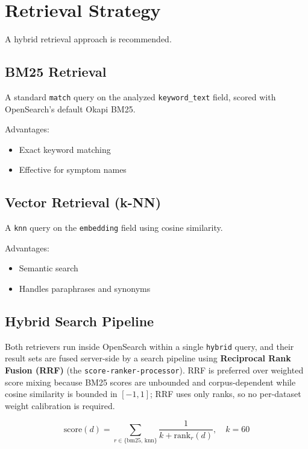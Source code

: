 \documentclass[11pt,a4paper]{article}
\begin{document}
\section{Retrieval Strategy}

A hybrid retrieval approach is recommended.

\subsection{BM25 Retrieval}

A standard \texttt{match} query on the analyzed \texttt{keyword\_text} field,
scored with OpenSearch's default Okapi BM25.

Advantages:

\begin{itemize}
    \item Exact keyword matching
    \item Effective for symptom names
\end{itemize}

\subsection{Vector Retrieval (k-NN)}

A \texttt{knn} query on the \texttt{embedding} field using cosine similarity.

Advantages:

\begin{itemize}
    \item Semantic search
    \item Handles paraphrases and synonyms
\end{itemize}

\subsection{Hybrid Search Pipeline}

Both retrievers run inside OpenSearch within a single \texttt{hybrid} query, and
their result sets are fused server-side by a search pipeline using
\textbf{Reciprocal Rank Fusion (RRF)} (the \texttt{score-ranker-processor}). RRF
is preferred over weighted score mixing because BM25 scores are unbounded and
corpus-dependent while cosine similarity is bounded in $[-1, 1]$; RRF uses only
ranks, so no per-dataset weight calibration is required.

\[
    \mathrm{score}(d) = \sum_{r \in \{\text{bm25},\,\text{knn}\}}
    \frac{1}{k + \mathrm{rank}_r(d)}, \quad k = 60
\]
\end{document}
